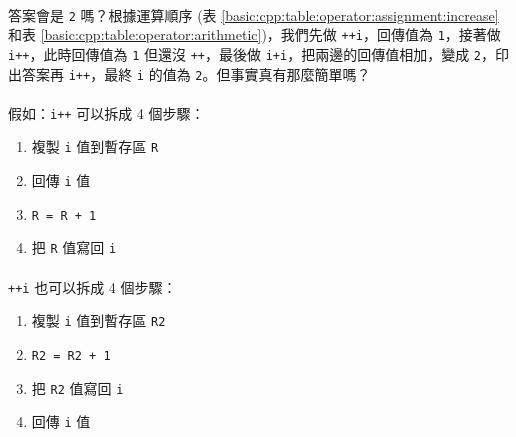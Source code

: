 \documentclass[12pt,a4paper,oneside]{report}
\begin{document}
\begin{CJK}{UTF8}{bkai}
\paragraph{}答案會是 \lstinline!2! 嗎？根據運算順序 (表 \ref{basic:cpp:table:operator:assignment:increase} 和表 \ref{basic:cpp:table:operator:arithmetic})，我們先做 \lstinline!++i!，回傳值為 \lstinline!1!，接著做 \lstinline!i++!，此時回傳值為 \lstinline!1! 但還沒 \lstinline!++!，最後做 \lstinline!i+i!，把兩邊的回傳值相加，變成 \lstinline!2!，印出答案再 \lstinline!i++!，最終 \lstinline!i! 的值為 \lstinline!2!。但事實真有那麼簡單嗎？

\paragraph{}假如：\lstinline!i++! 可以拆成 4 個步驟：
\begin{enumerate}
\item {\color{blue}複製 \lstinline!i! 值到暫存區 \lstinline!R!}
\item {\color{blue}回傳 \lstinline!i! 值}
\item {\color{blue}\lstinline!R = R + 1!}
\item {\color{blue}把 \lstinline!R! 值寫回 \lstinline!i!}
\end{enumerate}

\paragraph{}\lstinline!++i! 也可以拆成 4 個步驟：
\begin{enumerate}
\item {\color{red}複製 \lstinline!i! 值到暫存區 \lstinline!R2!}
\item {\color{red}\lstinline!R2 = R2 + 1!}
\item {\color{red}把 \lstinline!R2! 值寫回 \lstinline!i!}
\item {\color{red}回傳 \lstinline!i! 值}
\end{enumerate}


\end{CJK}
\end{document}
